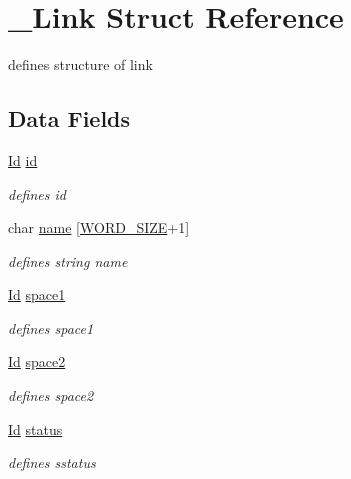 \hypertarget{struct__Link}{}\section{\+\_\+\+Link Struct Reference}
\label{struct__Link}


defines structure of link  


\subsection*{Data Fields}
\begin{DoxyCompactItemize}
\item 
\mbox{\label{struct__Link_a151212e7a8e8274c2a1ee991ba95878b}} 
\hyperlink{types_8h_a845e604fb28f7e3d97549da3448149d3}{Id} \hyperlink{struct__Link_a151212e7a8e8274c2a1ee991ba95878b}{id}
\begin{DoxyCompactList}\small\item\em defines id \end{DoxyCompactList}\item 
\mbox{\label{struct__Link_a020ee863120055b29609157b9de3c84d}} 
char \hyperlink{struct__Link_a020ee863120055b29609157b9de3c84d}{name} \mbox{[}\hyperlink{types_8h_a92ed8507d1cd2331ad09275c5c4c1c89}{W\+O\+R\+D\+\_\+\+S\+I\+ZE}+1\mbox{]}
\begin{DoxyCompactList}\small\item\em defines string name \end{DoxyCompactList}\item 
\mbox{\label{struct__Link_aabaabaea67e2e626e413fab3324087ff}} 
\hyperlink{types_8h_a845e604fb28f7e3d97549da3448149d3}{Id} \hyperlink{struct__Link_aabaabaea67e2e626e413fab3324087ff}{space1}
\begin{DoxyCompactList}\small\item\em defines space1 \end{DoxyCompactList}\item 
\mbox{\label{struct__Link_aa526fe717007b3865bf2bd7b9dd0655d}} 
\hyperlink{types_8h_a845e604fb28f7e3d97549da3448149d3}{Id} \hyperlink{struct__Link_aa526fe717007b3865bf2bd7b9dd0655d}{space2}
\begin{DoxyCompactList}\small\item\em defines space2 \end{DoxyCompactList}\item 
\mbox{\label{struct__Link_a77ce1098e94225bb67c9ea96485de5f7}} 
\hyperlink{types_8h_a845e604fb28f7e3d97549da3448149d3}{Id} \hyperlink{struct__Link_a77ce1098e94225bb67c9ea96485de5f7}{status}
\begin{DoxyCompactList}\small\item\em defines sstatus \end{DoxyCompactList}\end{DoxyCompactItemize}


